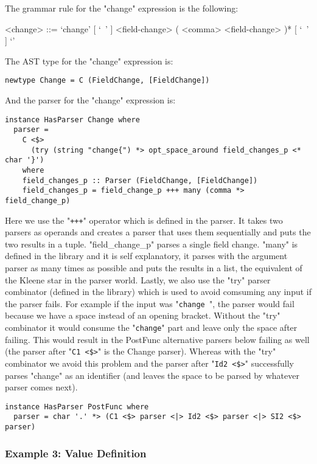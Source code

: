 \documentclass{article}
\begin{document}
The grammar rule for the "change" expression is the following:
\begin{grammar}
<change> ::=
`change{' [ `\ ' ] <field-change> ( <comma> <field-change> )* [ `\ ' ] `}'
\\
\end{grammar}
The AST type for the "change" expression is:
\begin{verbatim}
newtype Change = C (FieldChange, [FieldChange])

\end{verbatim}
And the parser for the "change" expression is:
\begin{verbatim}
instance HasParser Change where
  parser = 
    C <$>
      (try (string "change{") *> opt_space_around field_changes_p <* char '}')
    where
    field_changes_p :: Parser (FieldChange, [FieldChange])
    field_changes_p = field_change_p +++ many (comma *> field_change_p)

\end{verbatim}
Here we use the "\verb|+++|" operator which is defined in the parser. It
takes two parsers as operands and creates a parser that uses them sequentially
and puts the two results in a tuple. "field_change_p" parses a single field
change. "many" is defined in the library and it is self explanatory, it parses
with the argument parser as many times as possible and puts the results in a
list, the equivalent of the Kleene star in the parser world.  Lastly, we also
use the "try" parser combinator (defined in the library) which is used to avoid
comsuming any input if the parser fails. For example if the input was
"\verb|change |", the parser would fail because we have a space instead of an
opening bracket.  Without the "try" combinator it would consume the
"\verb|change|" part and leave only the space after failing. This would
result in the PostFunc alternative parsers below failing as well (the parser
after "\verb|C1 <$>|" is the Change parser). Whereas with the "try"
combinator we avoid this problem and the parser after "\verb|Id2 <$>|"
successfully parses "change" as an identifier (and leaves the space to be
parsed by whatever parser comes next).

\begin{verbatim}
instance HasParser PostFunc where
  parser = char '.' *> (C1 <$> parser <|> Id2 <$> parser <|> SI2 <$> parser)
\end{verbatim}


\subsubsection{Example 3: Value Definition}
\end{document}
